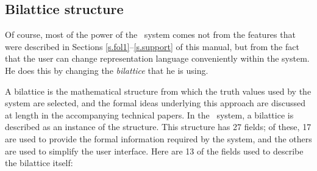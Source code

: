 \subsection{Bilattice structure}

Of course, most of the power of the \mvl\ system comes not from the
features that were described in Sections \ref{s.fol1}--\ref{s.support}
of this manual, but from the fact that the user can change
representation language conveniently within the system.  He does this
by changing the {\em bilattice\/} that he is using.

A bilattice is the mathematical structure from which the truth values
used by the system are selected, and the formal ideas underlying this
approach are discussed at length in the accompanying technical
papers.  In the \mvl\ system, a bilattice is described as an instance
of the  structure.  This structure has 27 fields; of
these, 17 are used to provide the formal information required by the
system, and the others are used to simplify the user interface.  Here
are 13 of the fields used to describe the bilattice itself:

